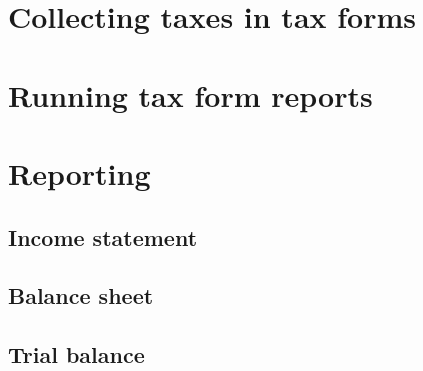 \section{Collecting taxes in tax forms}


\section{Running tax form reports}


\section{Reporting}
\subsection{Income statement}
\subsection{Balance sheet}
\subsection{Trial balance}


